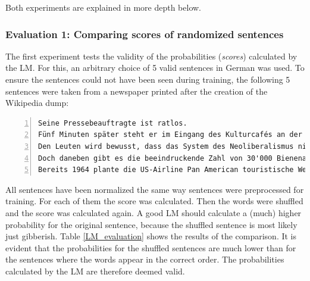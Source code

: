 Both experiments are explained in more depth below.

\subsubsection{Evaluation 1: Comparing scores of randomized sentences}

The first experiment tests the validity of the probabilities (\textit{scores}) calculated by the \ac{LM}. For this, an arbitrary choice of 5 valid sentences in German was used. To ensure the sentences could not have been seen during training, the following 5 sentences were taken from a newspaper printed after the creation of the Wikipedia dump:

\begin{lstlisting}[numbers=left, caption=Representation in corpus]
Seine Pressebeauftragte ist ratlos.
Fünf Minuten später steht er im Eingang des Kulturcafés an der Zürcher Europaallee.
Den Leuten wird bewusst, dass das System des Neoliberalismus nicht länger tragfähig ist.
Doch daneben gibt es die beeindruckende Zahl von 30'000 Bienenarten, die man unter dem Begriff «Wildbienen» zusammenfasst.
Bereits 1964 plante die US-Airline Pan American touristische Weltraumflüge für das Jahr 2000.
\end{lstlisting}

All sentences have been normalized the same way sentences were preprocessed for training. For each of them the score was calculated. Then the words were shuffled and the score was calculated again. A good \ac{LM} should calculate a (much) higher probability for the original sentence, because the shuffled sentence is most likely just gibberish.  Table \ref{LM_evaluation} shows the results of the comparison. It is evident that the probabilities for the shuffled sentences are much lower than for the sentences where the words appear in the correct order. The probabilities calculated by the \ac{LM} are therefore deemed valid.

